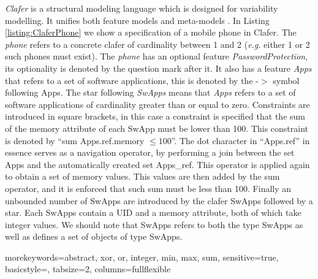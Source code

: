 \documentclass{article}
\newcommand{\eg}{\emph{e.g.}\xspace}
\begin{document}
\emph{Clafer} is a structural modeling language which is designed for variability modelling. It unifies both feature models  and meta-models \cite{BakClaferSLE2010}.
%
In Listing \ref{listing:ClaferPhone}  we show a specification of a mobile phone in Clafer. 
%
The \emph{phone} refers to a concrete clafer of cardinality between 1 and 2 (\eg either 1 or 2 such phones must exist). The \emph{phone} has an optional feature \emph{PasswordProtection}, its optionality is denoted by the question mark after it. It also has  a feature \emph{Apps} that refers  to a set of software applications, this is denoted by the  -$>$ symbol following  Apps. 
%
The star following  \emph{SwApps} means that \emph{Apps} refers to a set of software applications of cardinality greater than or equal to zero. 
%
Constraints are introduced in  square brackets, in this case a constraint is specified that the sum of the memory attribute of each SwApp must be lower than 100.  This constraint is denoted by ``sum Apps.ref.memory $\le 100$''. 
%
The dot character in ``Apps.ref''  in essence serves as a navigation operator, by performing a join between the set Apps and the automatically created set Apps\_ref. This operator is applied again to obtain a set of memory values. This values are then added by the sum operator, and it is enforced that such sum must be less than 100.
%
Finally an unbounded number of SwApps are introduced by the clafer SwApps followed by a star. Each SwApps contain a UID and a memory attribute, both of which take integer values.  
%
We should note that SwApps refers to both the type SwApps as well as defines a set of objects of type SwApps.

{morekeywords={abstract, xor, or, integer, min, max, sum},
sensitive=true,
basicstyle={\sffamily\small},
tabsize=2,
columns=fullflexible
}
\end{document}

